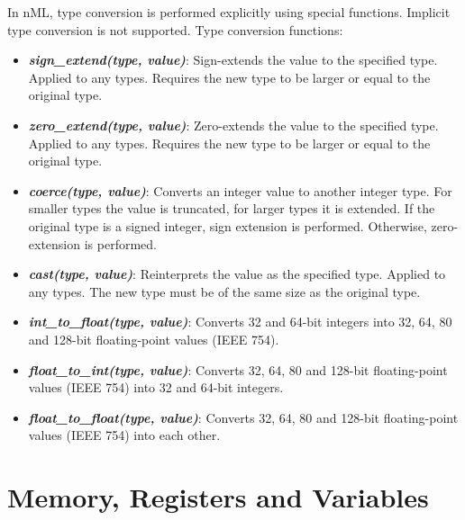 \documentclass[oneside,final,14pt]{extreport}
\begin{document}
In nML, type conversion is performed explicitly using special functions.
Implicit type conversion is not supported. Type conversion functions:

\begin{itemize}
\item \textbf{\textit{sign{\_}extend(type, value)}}:
Sign-extends the value to the specified type. Applied to any types. Requires
the new type to be larger or equal to the original type.

\item \textbf{\textit{zero{\_}extend(type, value)}}:
Zero-extends the value to the specified type. Applied to any types. Requires
the new type to be larger or equal to the original type.

\item \textbf{\textit{coerce(type, value)}}:
Converts an integer value to another integer type. For smaller types the value
is truncated, for larger types it is extended. If the original type is a signed
integer, sign extension is performed. Otherwise, zero-extension is performed.

\item \textbf{\textit{cast(type, value)}}:
Reinterprets the value as the specified type. Applied to any types. The new type
must be of the same size as the original type.

\item \textbf{\textit{int{\_}to{\_}float(type, value)}}:
Converts 32 and 64-bit integers into 32, 64, 80 and 128-bit floating-point
values (IEEE 754).

\item \textbf{\textit{float{\_}to{\_}int(type, value)}}:
Converts 32, 64, 80 and 128-bit floating-point values (IEEE 754) into 32 and
64-bit integers.

\item \textbf{\textit{float{\_}to{\_}float(type, value)}}:
Converts 32, 64, 80 and 128-bit floating-point values (IEEE 754) into each
other.

\end{itemize}


\section{Memory, Registers and Variables}



\end{document}
